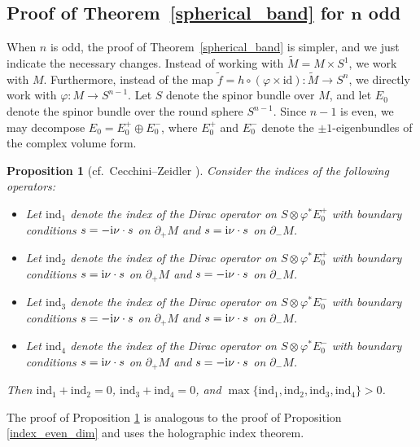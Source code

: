 \documentclass[pdftex]{sigma}
\numberwithin{equation}{section}
\newtheorem{Proposition}[Theorem]{Proposition}
 { \theoremstyle{definition}
\newtheorem{Definition}[Theorem]{Definition}
\newtheorem{Note}[Theorem]{Note}
\newtheorem{Example}[Theorem]{Example}
\newtheorem{Remark}[Theorem]{Remark} }
\newcommand{\id}{\mathrm{id}}
\begin{document}
\subsection[Proof of Theorem~\ref{spherical_band} for n odd]{Proof of Theorem~\ref{spherical_band} for $\boldsymbol{n}$ odd}

When $n$ is odd, the proof of Theorem~\ref{spherical_band} is simpler, and we just indicate the necessary changes.
Instead of working with $\tilde{M} = M \times S^1$, we work with $M$.
Furthermore, instead of the map $\tilde{f} = h \circ (\varphi \times \id)\colon \tilde{M} \to S^n$, we directly work with $\varphi\colon M \to S^{n-1}$.
Let $S$ denote the spinor bundle over $M$, and let $E_0$ denote the spinor bundle over the round sphere $S^{n-1}$.
Since $n-1$ is even, we may decompose $E_0 = E_0^+ \oplus E_0^-$, where $E_0^+$ and $E_0^-$ denote the $\pm 1$-eigenbundles of the complex volume form.

\begin{Proposition}[cf.\ Cecchini--Zeidler \cite{Cecchini-Zeidler}]
\label{index_odd_dim}
Consider the indices of the following operators:
\begin{itemize}\itemsep=0pt
\item Let $\mathrm{ind}_1$ denote the index of the Dirac operator on $S \otimes \varphi^* E_0^+$ with boundary conditions $s = -{\rm i} \nu \cdot s$ on $\partial_+ M$ and $s = {\rm i} \nu \cdot s$ on $\partial_- M$.
\item Let $\mathrm{ind}_2$ denote the index of the Dirac operator on $S \otimes \varphi^* E_0^+$ with boundary conditions $s = {\rm i} \nu \cdot s$ on $\partial_+ M$ and $s = -{\rm i} \nu \cdot s$ on $\partial_- M$.
\item Let $\mathrm{ind}_3$ denote the index of the Dirac operator on $S \otimes \varphi^* E_0^-$ with boundary conditions $s = -{\rm i} \nu \cdot s$ on $\partial_+ M$ and $s = {\rm i} \nu \cdot s$ on $\partial_- M$.
\item Let $\mathrm{ind}_4$ denote the index of the Dirac operator on $S \otimes \varphi^* E_0^-$ with boundary conditions $s = {\rm i} \nu \cdot s$ on $\partial_+ M$ and $s = -{\rm i} \nu \cdot s$ on $\partial_- M$.
\end{itemize}
Then $\mathrm{ind}_1+\mathrm{ind}_2=0$, $\mathrm{ind}_3+\mathrm{ind}_4=0$, and $\max \{\mathrm{ind}_1,\mathrm{ind}_2, \mathrm{ind}_3, \mathrm{ind}_4\} > 0$.
\end{Proposition}

The proof of Proposition \ref{index_odd_dim} is analogous to the proof of Proposition \ref{index_even_dim} and uses the holographic index theorem.
\end{document}
